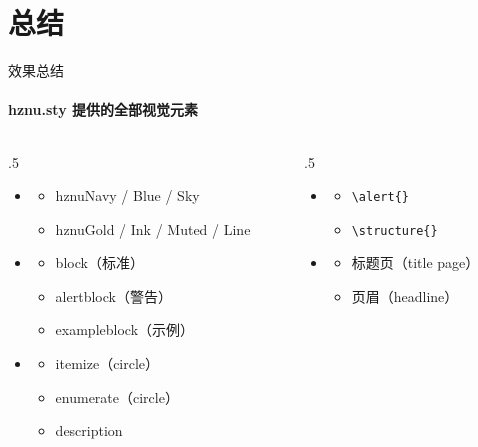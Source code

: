 \documentclass[10pt,aspectratio=169]{beamer}
\begin{document}
\section{总结}
\begin{frame}{效果总结}
  \framesubtitle{hznu.sty 提供的全部视觉元素}

  \begin{columns}[T]
    \begin{column}{.5\textwidth}
      \begin{itemize}
        \item {}
        \begin{itemize}
          \item hznuNavy / Blue / Sky
          \item hznuGold / Ink / Muted / Line
        \end{itemize}
        \item {}
        \begin{itemize}
          \item block（标准）
          \item alertblock（警告）
          \item exampleblock（示例）
        \end{itemize}
        \item {}
        \begin{itemize}
          \item itemize（circle）
          \item enumerate（circle）
          \item description
        \end{itemize}
      \end{itemize}
    \end{column}
    \begin{column}{.5\textwidth}
      \begin{itemize}
        \item {}
        \begin{itemize}
          \item \texttt{\textbackslash alert\{\}}
          \item \texttt{\textbackslash structure\{\}}
        \end{itemize}
        \item {}
        \begin{itemize}
          \item 标题页（title page）
          \item 页眉（headline）

\end{itemize}
\end{itemize}
\end{column}
\end{columns}
\end{frame}
\end{document}
